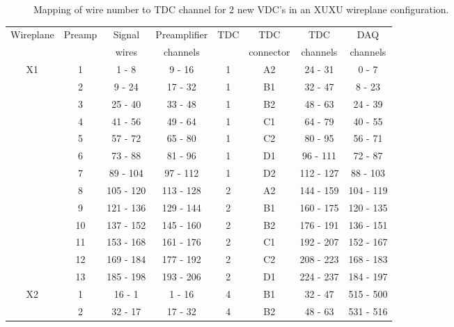 \documentclass[11pt]{report}
\begin{document}
\begin{itemize}
\begin{figure}[]
\centerline{\vspace{0cm}\hspace{0cm}
 }
\centering
\caption{Mapping of wire number to TDC channel for 2 new VDC's in an XUXU wireplane configuration.}
\label{fig:k600-electronics-vme-cabling}
\end{figure} 


\begin{table}[!t]
\centering
\begin{tabular}{c|c|c|c|c|c|c|c}
\hline
\hline
Wireplane & Preamp & Signal   & Preamplifier  & TDC & TDC        & TDC      &  DAQ     \\
          &        & wires    & channels      &     & connector  & channels &  channels\\
\hline
X1 & 1 & 1  - 8 & 9  - 16 	  &     1& 	A2 &    24 - 31   & 0  - 7  \\
   & 2 & 9  - 24& 17 - 32 	  &     1& 	B1 & 	32 - 47   & 8  - 23  \\
   & 3&  25 - 40& 	33 -	48& 	1& 	B2& 	48 -	63& 	24 -	39 \\
   & 4&  41 - 56& 	49 -	64& 	1& 	C1& 	64 -	79& 	40 -	55 \\
   & 5&  57 - 72& 	65 -	80& 	1& 	C2& 	80 -	95& 	56 -	71 \\
   & 6&  73 - 88& 	81 -	96& 	1& 	D1& 	96 -	111& 	72 -	87 \\
   & 7&  89 - 104& 	97 -	112& 	1& 	D2& 	112 -	127& 	88 -	103 \\
   & 8&  105 - 120& 	113 -	128& 	2& 	A2& 	144 -	159& 	104 - 	119 \\
   & 9&  121 - 136& 	129 -	144& 	2& 	B1& 	160 -	175& 	120 -	135 \\
   & 10& 137 - 152& 	145 -	160& 	2& 	B2& 	176 -	191& 	136 -	151 \\
   & 11& 153 - 168& 	161 -	176& 	2& 	C1& 	192 -	207& 	152 -	167 \\
   & 12& 169 - 184& 	177 - 	192& 	2& 	C2& 	208 -	223& 	168 -	183 \\
   & 13& 185 - 198& 	193 -	206& 	2& 	D1& 	224 -	237& 	184 -	197 \\
\hline
X2 & 1& 16 -	1& 	1 -	16& 	4& 	B1& 	32 -	47& 	515 - 	500 \\
   & 2&	32 -	17&	17 -	32&	4&	B2&	48 -	63&	531 -	516 \\

\end{tabular}
\end{table}
\end{itemize}
\end{document}
